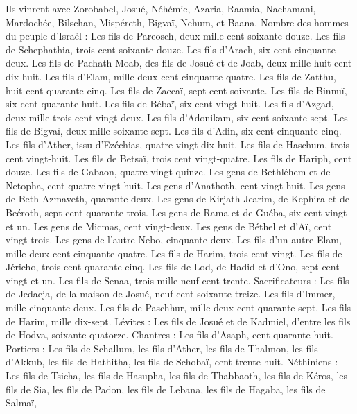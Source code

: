 \begin{multicols}{2}
Ils vinrent avec Zorobabel, Josué, Néhémie, Azaria, Raamia, Nachamani, Mardochée, Bilschan, Mispéreth, Bigvaï, Nehum, et Baana. Nombre des hommes du peuple d'Israël :
Les fils de Pareosch, deux mille cent soixante-douze.
Les fils de Schephathia, trois cent soixante-douze.
Les fils d'Arach, six cent cinquante-deux.
Les fils de Pachath-Moab, des fils de Josué et de Joab, deux mille huit cent dix-huit.
Les fils d’Elam, mille deux cent cinquante-quatre.
Les fils de Zatthu, huit cent quarante-cinq.
Les fils de Zaccaï, sept cent soixante.
Les fils de Binnuï, six cent quarante-huit.
Les fils de Bébaï, six cent vingt-huit.
Les fils d’Azgad, deux mille trois cent vingt-deux.
Les fils d'Adonikam, six cent soixante-sept.
Les fils de Bigvaï, deux mille soixante-sept.
Les fils d’Adin, six cent cinquante-cinq.
Les fils d'Ather, issu d'Ezéchias, quatre-vingt-dix-huit.
Les fils de Haschum, trois cent vingt-huit.
Les fils de Betsaï, trois cent vingt-quatre.
Les fils de Hariph, cent douze.
Les fils de Gabaon, quatre-vingt-quinze.
Les gens de Bethléhem et de Netopha, cent quatre-vingt-huit.
Les gens d'Anathoth, cent vingt-huit.
Les gens de Beth-Azmaveth, quarante-deux.
Les gens de Kirjath-Jearim, de Kephira et de Beéroth, sept cent quarante-trois.
Les gens de Rama et de Guéba, six cent vingt et un.
Les gens de Micmas, cent vingt-deux.
Les gens de Béthel et d’Aï, cent vingt-trois.
Les gens de l'autre Nebo, cinquante-deux.
Les fils d'un autre Elam, mille deux cent cinquante-quatre.
Les fils de Harim, trois cent vingt.
Les fils de Jéricho, trois cent quarante-cinq.
Les fils de Lod, de Hadid et d'Ono, sept cent vingt et un.
Les fils de Senaa, trois mille neuf cent trente.
Sacrificateurs : Les fils de Jedaeja, de la maison de Josué, neuf cent soixante-treize.
Les fils d'Immer, mille cinquante-deux.
Les fils de Paschhur, mille deux cent quarante-sept.
Les fils de Harim, mille dix-sept.
Lévites : Les fils de Josué et de Kadmiel, d'entre les fils de Hodva, soixante quatorze.
Chantres : Les fils d'Asaph, cent quarante-huit.
Portiers : Les fils de Schallum, les fils d'Ather, les fils de Thalmon, les fils d'Akkub, les fils de Hathitha, les fils de Schobaï, cent trente-huit.
Néthiniens : Les fils de Tsicha, les fils de Hasupha, les fils de Thabbaoth,
les fils de Kéros, les fils de Sia, les fils de Padon,
les fils de Lebana, les fils de Hagaba, les fils de Salmaï,

\end{multicols}
